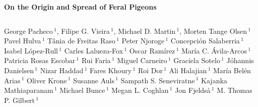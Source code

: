 \documentclass[a4paper]{article}
\begin{document}
\begin{center}
\noindent \LARGE \bfseries {} On the Origin and Spread of Feral Pigeons \\
\end{center}

\begin{lstlisting}
\end{lstlisting}

 \small \noindent 
George Pacheco\,$^{1}$,
Filipe G. Vieira\,$^{1}$,
Michael D. Martin\,$^{1}$,
Morten Tange Olsen\,$^{1}$
Pavel Hulva\,$^{1}$
Tânia de Freitas Raso\,$^{1}$
Peter Njoroge\,$^{1}$
Concepción Salaberria\,$^{1}$
Isabel López-Rull\,$^{1}$
Carles Lalueza-Fox\,$^{1}$
Oscar Ramírez\,$^{1}$
María C. Ávila-Arcos\,$^{1}$
Patricia Rosas Escobar\,$^{1}$
Rui Faria\,$^{1}$
Miguel Carneiro\,$^{1}$
Graciela Sotelo\,$^{1}$
Jóhannis Danielsen\,$^{1}$
Nizar Haddad\,$^{1}$
Fares Khoury\,$^{1}$
Roi Dor\,$^{1}$
Ali Halajian\,$^{1}$
María Belén Arias\,$^{1}$
Oliver Krone\,$^{1}$
Susanne Auls\,$^{1}$
Sampath S. Seneviratne\,$^{1}$
Kajanka Mathiaparanam\,$^{1}$
Michael Bunce\,$^{1}$
Megan L. Coghlan\,$^{1}$
Jon Fjeldså\,$^{1}$
M. Thomas P. Gilbert\,$^{1}$
\end{document}
